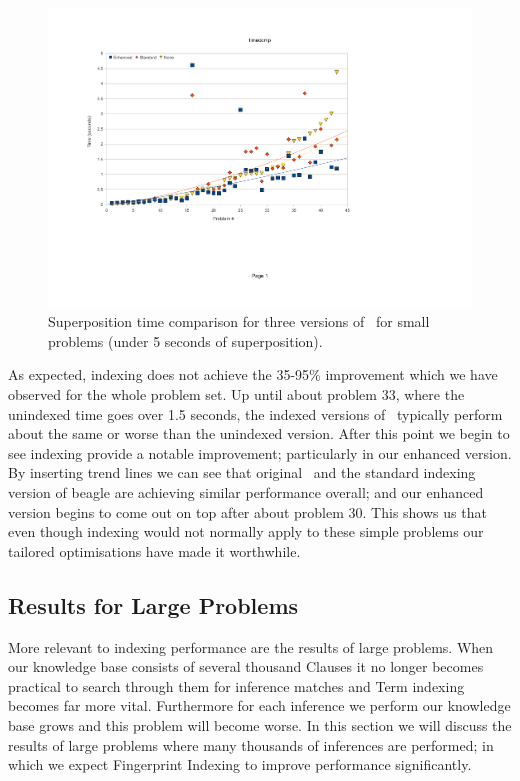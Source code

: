 \begin{figure}[h]
  \includegraphics[trim=2.45cm 6cm 8cm 3cm,clip,width=\textwidth]{resources/suptimetrends}
  \caption{Superposition time comparison for three versions of \beagle\ for small problems
  (under 5 seconds of superposition).}
  \label{fig:worst}
\end{figure}

As expected, indexing does not achieve the 35-95\% improvement which
we have observed for the whole problem set. Up until about problem 33, where
the unindexed time goes over 1.5 seconds, the indexed versions of \beagle\ typically
perform about the same or worse than the unindexed version. After this point we
begin to see indexing provide a notable improvement; particularly in our enhanced
version. By inserting trend lines we can see that original \beagle\ and the standard
indexing version of beagle are achieving similar performance overall; and our enhanced
version begins to come out on top after about problem 30. This shows us that
even though indexing would not normally apply to these simple problems our tailored
optimisations have made it worthwhile.

\subsection{Results for Large Problems}
\label{sec:large}

More relevant to indexing performance are the results of large problems. When our
knowledge base consists of several thousand Clauses it no longer becomes practical
to search through them for inference matches and Term indexing becomes far more vital.
Furthermore for each inference we perform our knowledge base grows and this problem will become worse.
In this section we will discuss the results of large problems where many thousands of
inferences are performed; in which we expect Fingerprint Indexing to improve performance
significantly.

